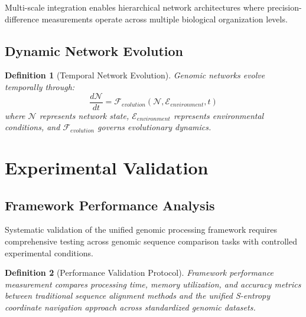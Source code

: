 \documentclass[12pt,a4paper]{article}
\newtheorem{definition}{Definition}
\begin{document}
Multi-scale integration enables hierarchical network architectures where precision-difference measurements operate across multiple biological organization levels.

\subsection{Dynamic Network Evolution}

\begin{definition}[Temporal Network Evolution]
Genomic networks evolve temporally through:
\begin{equation}
\frac{d\mathcal{N}}{dt} = \mathcal{F}_{evolution}(\mathcal{N}, \mathcal{E}_{environment}, t)
\end{equation}
where $\mathcal{N}$ represents network state, $\mathcal{E}_{environment}$ represents environmental conditions, and $\mathcal{F}_{evolution}$ governs evolutionary dynamics.
\end{definition}

\section{Experimental Validation}

\subsection{Framework Performance Analysis}

Systematic validation of the unified genomic processing framework requires comprehensive testing across genomic sequence comparison tasks with controlled experimental conditions.

\begin{definition}[Performance Validation Protocol]
Framework performance measurement compares processing time, memory utilization, and accuracy metrics between traditional sequence alignment methods and the unified S-entropy coordinate navigation approach across standardized genomic datasets.
\end{definition}
\end{document}
